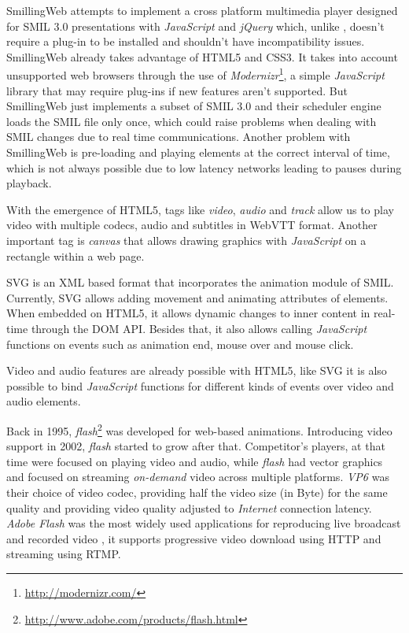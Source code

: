   SmillingWeb \cite{smillingweb} attempts to implement a cross platform multimedia player designed for \ac{SMIL} 3.0 presentations with \emph{JavaScript} and \emph{jQuery} which, unlike \cite{ambulant}, doesn't require a plug-in to be installed and shouldn't have incompatibility issues. 
  SmillingWeb already takes advantage of \ac{HTML}5 and \ac{CSS}3.
  It takes into account unsupported web browsers through the use of \emph{Modernizr}\footnote{\url{http://modernizr.com/}}, a simple \emph{JavaScript} library that may require plug-ins if new features aren't supported.  
  But SmillingWeb just implements a subset of \ac{SMIL} 3.0 and their scheduler engine loads the \ac{SMIL} file only once, which could raise problems when dealing with \ac{SMIL} changes due to real time communications.
  Another problem with SmillingWeb is pre-loading and playing elements at the correct interval of time, which is not always possible due to low latency networks leading to  pauses during playback.
  
  With the emergence of \ac{HTML}5, tags like \emph{video}, \emph{audio} and \emph{track} allow us to play video with multiple codecs, audio and subtitles in \ac{WebVTT} format. Another important tag is \emph{canvas} that allows drawing graphics with \emph{JavaScript} on a rectangle within a web page.

  
  \ac{SVG} is an \ac{XML} based format that incorporates the animation module of \ac{SMIL}. Currently, \ac{SVG} allows adding movement and animating attributes of elements. When embedded on \ac{HTML}5, it allows dynamic changes to inner content in real-time through the \ac{DOM} \ac{API}. Besides that, it also allows calling \emph{JavaScript} functions on events such as animation end, mouse over and mouse click.

  Video and audio features are already possible with \ac{HTML}5, like \ac{SVG} it is also possible to bind \emph{JavaScript} functions for different kinds of events over video and audio elements.
  
  Back in 1995, \emph{flash}\footnote{\url{http://www.adobe.com/products/flash.html}} was developed for web-based animations. Introducing video support in 2002, \emph{flash} started to grow after that. Competitor's players, at that time were focused on playing video and audio, while \emph{flash} had vector graphics and focused on streaming \emph{on-demand} video across multiple platforms. \emph{VP6} was their choice of video codec, providing half the video size (in Byte) for the same quality and providing video quality adjusted to \emph{Internet} connection latency. 
  \emph{Adobe Flash} was the most widely used applications for reproducing live broadcast and recorded video \cite{flashvideo}, it supports progressive video download using \ac{HTTP} and streaming using \ac{RTMP}.

